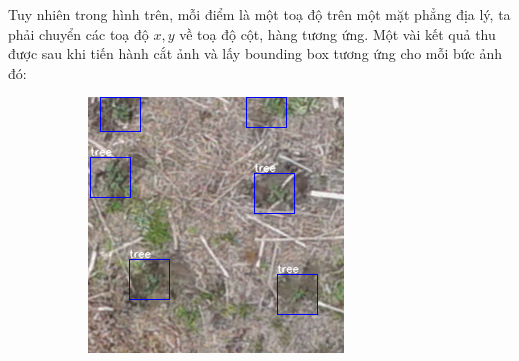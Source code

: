 \documentclass[a4paper, 12pt]{report}
\begin{document}
\begin{enumerate}[label= \textit{\alph*)}]
%
\newpage
Tuy nhiên trong hình trên, mỗi điểm là một toạ độ trên một mặt phẳng địa lý,  ta phải chuyển các toạ độ $x,y$ về toạ độ cột,  hàng tương ứng.  Một vài kết quả thu được sau khi tiến hành cắt ảnh và lấy bounding box tương ứng cho mỗi bức ảnh đó: 
\newpage
\begin{figure}[!h]
    \centering
    \begin{subfigure}[!h]{0.45\textwidth}
    \includegraphics[width=\linewidth]{Images/split1}

\end{subfigure}
\end{figure}
\end{enumerate}
\end{document}
